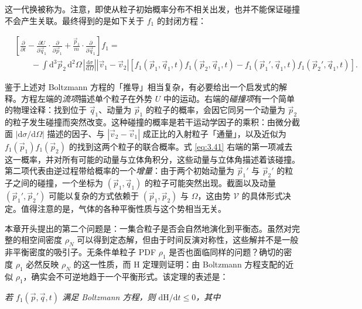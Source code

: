 这一代换被称为。注意，即使从粒子初始概率分布不相关出发，也并不能保证碰撞不会产生关联。最终得到的是如下关于 $f_1$ 的封闭方程：

\begin{equation}\label{eq:3.41}
  \begin{aligned}
    &\left[\frac{\partial}{\partial t}-\frac{\partial U}{\partial\vec q_1}\cdot\frac{\partial}{\partial\vec p_1}+\frac{\vec p_1}{m}\cdot\frac{\partial}{\partial\vec q_1}\right]f_1=\\
    &\qquad-\int \mathrm{d}^3\vec p_2\,\mathrm{d}^2\Omega\,\left|\frac{\mathrm{d}\sigma}{\mathrm{d}\Omega}\right||\vec v_1-\vec v_2|\left[f_1(\vec p_1,\vec q_1,t)f_1(\vec p_2,\vec q_1,t)-f_1(\vec p_1',\vec q_1,t)f_1(\vec p_2',\vec q_1,t)\right].
  \end{aligned}
\end{equation}

鉴于上述对 Boltzmann 方程的「推导」相当复杂，有必要给出一个启发式的解释。方程左端的\emph{流项}描述单个粒子在外势 $U$ 中的运动。右端的\emph{碰撞项}有一个简单的物理诠释：找到位于 $\vec q_1$、动量为 $\vec p_1$ 的粒子的概率，会因它同另一个动量为 $\vec p_2$ 的粒子发生碰撞而突然改变。这种碰撞的概率是若干运动学因子的乘积：由微分截面 $|\mathrm{d}\sigma/\mathrm{d}\Omega|$ 描述的因子、与 $|\vec v_2-\vec v_1|$ 成正比的入射粒子「通量」，以及近似为 $f_1(\vec p_1)f_1(\vec p_2)$ 的找到这两个粒子的联合概率。式 \eqref{eq:3.41} 右端的第一项减去这一概率，并对所有可能的动量与立体角积分，这些动量与立体角描述着该碰撞。第二项代表由逆过程带给概率的一个\emph{增量}：由于两个初始动量为 $\vec p_1'$ 与 $\vec p_2'$ 的粒子之间的碰撞，一个坐标为 $(\vec p_1,\vec q_1)$ 的粒子可能突然出现。截面以及动量 $(\vec p_1',\vec p_2')$ 可能以复杂的方式依赖于 $(\vec p_1,\vec p_2)$ 与 $\Omega$，这由势 $\mathscr V$ 的具体形式决定。值得注意的是，气体的各种平衡性质与这个势相当无关。


本章开头提出的第二个问题是：一集合粒子是否会自然地演化到平衡态。虽然对完整的相空间密度 $\rho_N$ 可以得到定态解，但由于时间反演对称性，这些解并不是一般非平衡密度的吸引子。无条件单粒子 PDF $\rho_1$ 是否也面临同样的问题？确切的密度 $\rho_1$ 必然反映 $\rho_N$ 的这一性质，而 H 定理则证明：由 Boltzmann 方程支配的近似 $\rho_1$，确实会不可逆地趋于一个平衡形式。该定理的表述是：

\emph{若 $f_1(\vec p,\vec q,t)$ 满足 Boltzmann 方程，则 $\mathrm{d}\mathrm{H}/\mathrm{d}t\le 0$，其中}

